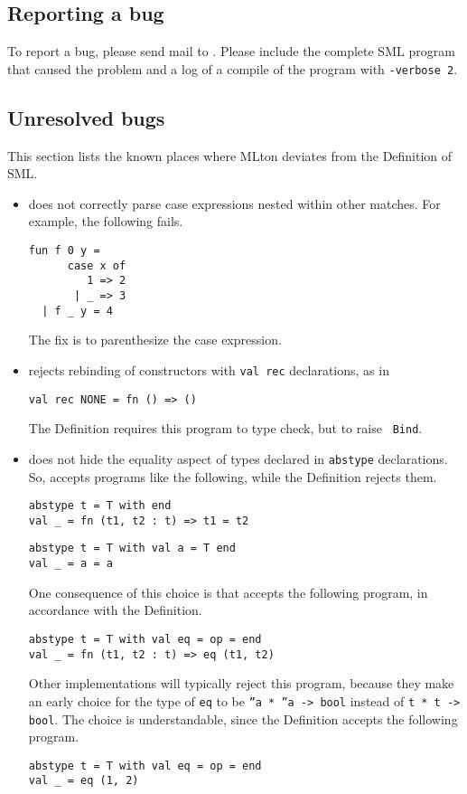 %
\subsection{Reporting a bug}

To report a bug, please send mail to {\mltonmail}.  Please include the
complete SML program that caused the problem and a log of a compile of
the program with {\tt -verbose 2}.
%
\subsection{Unresolved bugs}

This section lists the known places where MLton deviates from the
Definition of SML.

\begin{itemize}

\item
{\mlton} does not correctly parse case expressions nested within other
matches.  For example, the following fails.
\begin{verbatim}
fun f 0 y =
      case x of
         1 => 2
       | _ => 3
  | f _ y = 4
\end{verbatim}
The fix is to parenthesize the case expression.

\item
{\mlton} rejects rebinding of constructors with {\tt val rec}
declarations, as in
\begin{verbatim}
val rec NONE = fn () => ()
\end{verbatim}
The Definition requires this program to type check, but to raise {\tt
Bind}.

\item
{\mlton} does not hide the equality aspect of types declared in
{\tt abstype} declarations.  So, {\mlton} accepts programs like the
following, while the Definition rejects them.
\begin{verbatim}
abstype t = T with end
val _ = fn (t1, t2 : t) => t1 = t2
\end{verbatim}

\begin{verbatim}
abstype t = T with val a = T end
val _ = a = a
\end{verbatim}

One consequence of this choice is that {\mlton} accepts the following
program, in accordance with the Definition.
\begin{verbatim}
abstype t = T with val eq = op = end
val _ = fn (t1, t2 : t) => eq (t1, t2)
\end{verbatim}
Other implementations will typically reject this program, because they
make an early choice for the type of {\tt eq} to be {\tt ''a * ''a ->
bool} instead of {\tt t * t -> bool}.  The choice is understandable,
since the Definition accepts the following program.
\begin{verbatim}
abstype t = T with val eq = op = end
val _ = eq (1, 2)
\end{verbatim}

\end{itemize}
